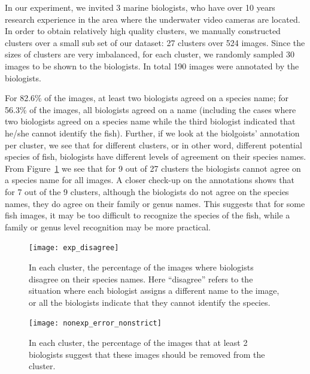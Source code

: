 In our experiment, we invited 3 marine biologists, who have over 10 years research experience in the area
where the underwater video cameras are located. In order to obtain relatively high quality clusters, 
we manually constructed clusters over a small sub set of our dataset: 27 clusters over 524 images.
Since the sizes of clusters are very imbalanced,
for each cluster, we randomly sampled 30 images to be shown to the
biologists. In total 190 images 
were annotated by the biologists. 


For 82.6\% of the images, at least two biologists agreed on a species name;
for 56.3\% of the images, all biologists agreed on a name (including the
cases where two biologists agreed on a species name while
the third biologist indicated that he/she cannot identify the fish).
Further, if we look at the biolgoists' annotation per cluster, we see that
for different clusters, or in other word, different potential species of fish, 
biologists have different levels of agreement on their species names. 
From Figure~\ref{fig:expertdis} we see that for 9 out of 27 clusters
the biologists cannot agree on a species name for all images. A closer check-up
on the annotations shows that for 7 out of the 9 clusters, although the biologists
do not agree on the species names, they do agree on their family or genus names.
This suggests that for some fish images, it may be too difficult to recognize the 
species of the fish, while a family or genus level recognition may be more practical. 

\begin{figure}
\begin{center}
\texttt{[image: exp\_disagree]}
\caption{In each cluster, the percentage of the images where biologists disagree on their species names.
Here ``disagree'' refers to the situation where each biologist assigns a different name to the image, 
or all the biologists indicate that they cannot identify the species. 
}
\label{fig:expertdis}
\end{center}
\end{figure}

\begin{figure}
\begin{center}
\texttt{[image: nonexp\_error\_nonstrict]}
\caption{
In each cluster, the percentage of the images that at least 2 biologists suggest that
these images should be removed from the cluster.
}
\label{fig:nonexp_error}
\end{center}
\end{figure}
  
